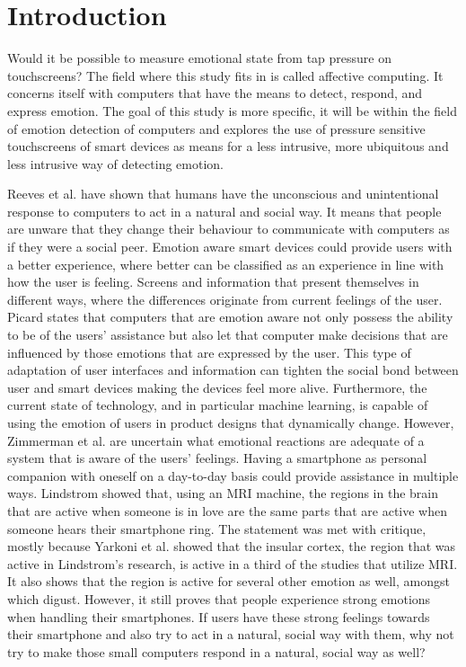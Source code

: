 \documentclass{sigchi}
\begin{document}
\section{Introduction} %
\label{sec:introduction}
Would it be possible to measure emotional state from tap pressure on touchscreens? The field where this study fits in is called affective computing. It concerns itself with computers that have the means to detect, respond, and express emotion. The goal of this study is more specific, it will be within the field of emotion detection of computers and explores the use of pressure sensitive touchscreens of smart devices as means for a less intrusive, more ubiquitous and less intrusive way of detecting emotion.

Reeves et al. \cite{Reeves1998} have shown that humans have the unconscious and unintentional response to computers to act in a natural and social way. It means that people are unware that they change their behaviour to communicate with computers as if they were a social peer. Emotion aware smart devices could provide users with a better experience, where better can be classified as an experience in line with how the user is feeling. Screens and information that present themselves in different ways, where the differences originate from current feelings of the user. Picard \cite{Picard1995} states that computers that are emotion aware not only possess the ability to be of the users' assistance but also let that computer make decisions that are influenced by those emotions that are expressed by the user. This type of adaptation of user interfaces and information can tighten the social bond between user and smart devices making the devices feel more alive. Furthermore, the current state of technology, and in particular machine learning, is capable of using the emotion of users in product designs that dynamically change. However, Zimmerman et al. \cite{Zimmermann2003} are uncertain what emotional reactions are adequate of a system that is aware of the users' feelings. Having a smartphone as personal companion with oneself on a day-to-day basis could provide assistance in multiple ways. Lindstrom \cite{Lindstrom2011} showed that, using an MRI machine, the regions in the brain that are active when someone is in love are the same parts that are active when someone hears their smartphone ring. The statement was met with critique, mostly because Yarkoni et al. \cite{Yarkoni2011} showed that the insular cortex, the region that was active in Lindstrom's research, is active in a third of the studies that utilize MRI. It also shows that the region is active for several other emotion as well, amongst which digust. However, it still proves that people experience strong emotions when handling their smartphones. If users have these strong feelings towards their smartphone and also try to act in a natural, social way with them, why not try to make those small computers respond in a natural, social way as well? 
\end{document}

